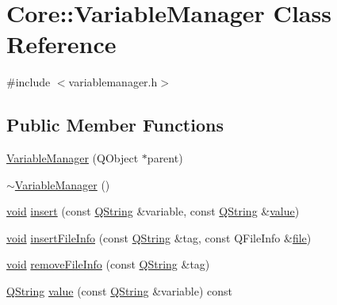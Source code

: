 \hypertarget{class_core_1_1_variable_manager}{\section{\-Core\-:\-:\-Variable\-Manager \-Class \-Reference}
\label{class_core_1_1_variable_manager}
}


{\ttfamily \#include $<$variablemanager.\-h$>$}

\subsection*{\-Public \-Member \-Functions}
\begin{DoxyCompactItemize}
\item 
\hyperlink{group___core_plugin_ga15d91d2d564a2725a182ed7db3291322}{\-Variable\-Manager} (\-Q\-Object $\ast$parent)
\item 
\hyperlink{group___core_plugin_gab026fb876b54cb8afb586a6b2722f903}{$\sim$\-Variable\-Manager} ()
\item 
\hyperlink{group___u_a_v_objects_plugin_ga444cf2ff3f0ecbe028adce838d373f5c}{void} \hyperlink{group___core_plugin_ga2965065fe2031c5056f2d0f0b3528aea}{insert} (const \hyperlink{group___u_a_v_objects_plugin_gab9d252f49c333c94a72f97ce3105a32d}{\-Q\-String} \&variable, const \hyperlink{group___u_a_v_objects_plugin_gab9d252f49c333c94a72f97ce3105a32d}{\-Q\-String} \&\hyperlink{group___core_plugin_ga587c5ac6a8da8fb4ef815b60fbf2b48f}{value})
\item 
\hyperlink{group___u_a_v_objects_plugin_ga444cf2ff3f0ecbe028adce838d373f5c}{void} \hyperlink{group___core_plugin_ga4cb680b84efeae7adb69d85e107971d8}{insert\-File\-Info} (const \hyperlink{group___u_a_v_objects_plugin_gab9d252f49c333c94a72f97ce3105a32d}{\-Q\-String} \&tag, const \-Q\-File\-Info \&\hyperlink{uavobjecttemplate_8m_a97c04efa65bcf0928abf9260bc5cbf46}{file})
\item 
\hyperlink{group___u_a_v_objects_plugin_ga444cf2ff3f0ecbe028adce838d373f5c}{void} \hyperlink{group___core_plugin_gaddc7379678c0d650267ea2946d5f6d3c}{remove\-File\-Info} (const \hyperlink{group___u_a_v_objects_plugin_gab9d252f49c333c94a72f97ce3105a32d}{\-Q\-String} \&tag)
\item 
\hyperlink{group___u_a_v_objects_plugin_gab9d252f49c333c94a72f97ce3105a32d}{\-Q\-String} \hyperlink{group___core_plugin_ga587c5ac6a8da8fb4ef815b60fbf2b48f}{value} (const \hyperlink{group___u_a_v_objects_plugin_gab9d252f49c333c94a72f97ce3105a32d}{\-Q\-String} \&variable) const 

\end{DoxyCompactItemize}

